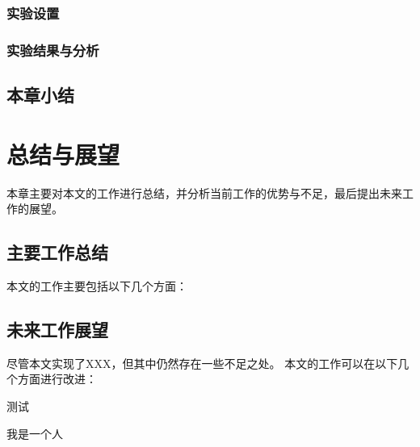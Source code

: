 \documentclass[algorithmlist, AutoFakeBold, AutoFakeSlant, figurelist, tablelist, nomlist, masters]{seuthesix}
\begin{document}
\subsection{实验设置}


\subsection{实验结果与分析}


\section{本章小结}



\chapter{总结与展望}
本章主要对本文的工作进行总结，并分析当前工作的优势与不足，最后提出未来工作的展望。

\section{主要工作总结}
本文的工作主要包括以下几个方面：

\section{未来工作展望}
尽管本文实现了XXX，但其中仍然存在一些不足之处。
本文的工作可以在以下几个方面进行改进：


\acknowledgement
测试


% 
% 
% 


\appendix
{}
我是一个人
\end{document}
